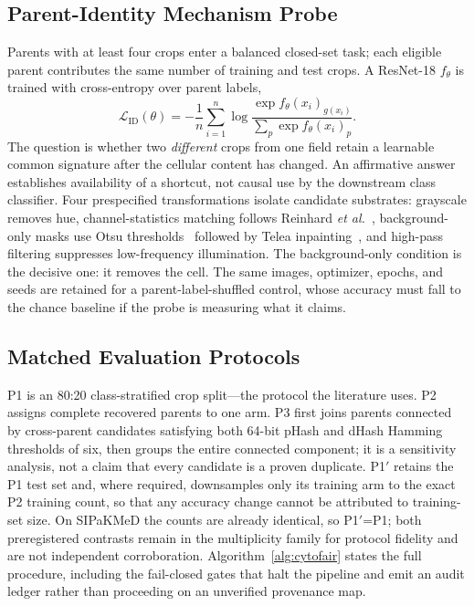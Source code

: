 \documentclass[conference]{IEEEtran}
\newcommand{\protocol}[1]{\textsf{#1}}
\begin{document}
\subsection{Parent-Identity Mechanism Probe}
\label{sec:probe}
Parents with at least four crops enter a balanced closed-set task; each eligible parent contributes the same number of training and test crops.
A ResNet-18 $f_\theta$ is trained with cross-entropy over parent labels,
\begin{equation}
\mathcal{L}_{\mathrm{ID}}(\theta)=-\frac{1}{n}\sum_{i=1}^{n}
\log \frac{\exp f_\theta(x_i)_{g(x_i)}}{\sum_{p}\exp f_\theta(x_i)_p}.
\label{eq:probe}
\end{equation}
The question is whether two \emph{different} crops from one field retain a learnable common signature after the cellular content has changed.
An affirmative answer establishes availability of a shortcut, not causal use by the downstream class classifier.
Four prespecified transformations isolate candidate substrates: grayscale removes hue, channel-statistics matching follows Reinhard \emph{et al.}~\cite{reinhard2001color}, background-only masks use Otsu thresholds~\cite{otsu1979threshold} followed by Telea inpainting~\cite{telea2004inpainting}, and high-pass filtering suppresses low-frequency illumination.
The background-only condition is the decisive one: it removes the cell.
The same images, optimizer, epochs, and seeds are retained for a parent-label-shuffled control, whose accuracy must fall to the chance baseline if the probe is measuring what it claims.

\subsection{Matched Evaluation Protocols}
\protocol{P1} is an 80:20 class-stratified crop split---the protocol the literature uses.
\protocol{P2} assigns complete recovered parents to one arm.
\protocol{P3} first joins parents connected by cross-parent candidates satisfying both 64-bit pHash and dHash Hamming thresholds of six, then groups the entire connected component; it is a sensitivity analysis, not a claim that every candidate is a proven duplicate.
\protocol{P1$'$} retains the \protocol{P1} test set and, where required, downsamples only its training arm to the exact \protocol{P2} training count, so that any accuracy change cannot be attributed to training-set size.
On SIPaKMeD the counts are already identical, so \protocol{P1$'$}=\protocol{P1}; both preregistered contrasts remain in the multiplicity family for protocol fidelity and are not independent corroboration.
Algorithm~\ref{alg:cytofair} states the full procedure, including the fail-closed gates that halt the pipeline and emit an audit ledger rather than proceeding on an unverified provenance map.
\end{document}
